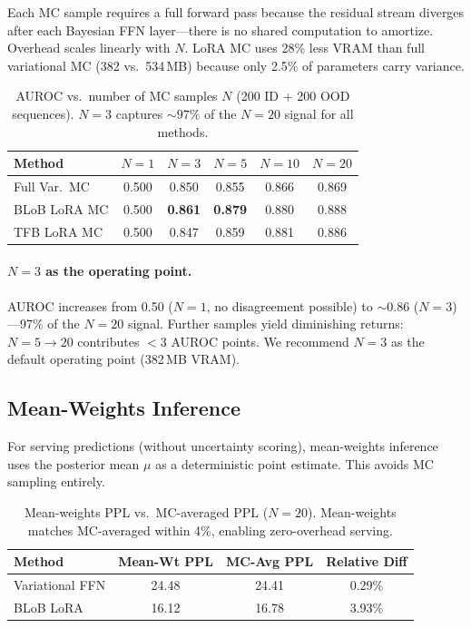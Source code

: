 \documentclass{article}
\newcommand{\ra}[1]{\renewcommand{\arraystretch}{#1}}
\begin{document}
Each MC sample requires a full forward pass because the residual stream diverges after each Bayesian FFN layer---there is no shared computation to amortize. Overhead scales linearly with $N$. LoRA MC uses 28\% less VRAM than full variational MC (382 vs.\ 534\,MB) because only 2.5\% of parameters carry variance.

\begin{table}[t]
\caption{AUROC vs.\ number of MC samples $N$ (200 ID + 200 OOD sequences). $N{=}3$ captures ${\sim}97\%$ of the $N{=}20$ signal for all methods.}
\label{tab:n-vs-auroc}
\centering
\small
\ra{1.15}
\begin{tabular}{@{}lccccc@{}}
\toprule
Method & $N{=}1$ & $N{=}3$ & $N{=}5$ & $N{=}10$ & $N{=}20$ \\
\midrule
Full Var.\ MC & 0.500 & 0.850 & 0.855 & 0.866 & 0.869 \\
BLoB LoRA MC & 0.500 & \textbf{0.861} & \textbf{0.879} & 0.880 & 0.888 \\
TFB LoRA MC & 0.500 & 0.847 & 0.859 & 0.881 & 0.886 \\
\bottomrule
\end{tabular}
\end{table}


\paragraph{$N{=}3$ as the operating point.}
AUROC increases from 0.50 ($N{=}1$, no disagreement possible) to ${\sim}$0.86 ($N{=}3$)---97\% of the $N{=}20$ signal. Further samples yield diminishing returns: $N{=}5 \to 20$ contributes $<$3 AUROC points. We recommend \textbf{$N{=}3$} as the default operating point (382\,MB VRAM).

\subsection{Mean-Weights Inference}

For serving predictions (without uncertainty scoring), mean-weights inference uses the posterior mean $\mu$ as a deterministic point estimate. This avoids MC sampling entirely.

\begin{table}[t]
\caption{Mean-weights PPL vs.\ MC-averaged PPL ($N{=}20$). Mean-weights matches MC-averaged within 4\%, enabling zero-overhead serving.}
\label{tab:mean-weights}
\centering
\small
\ra{1.15}
\begin{tabular}{@{}lccc@{}}
\toprule
Method & Mean-Wt PPL & MC-Avg PPL & Relative Diff \\
\midrule
Variational FFN & 24.48 & 24.41 & 0.29\% \\
BLoB LoRA & 16.12 & 16.78 & 3.93\% \\
\bottomrule
\end{tabular}
\end{table}
\end{document}

